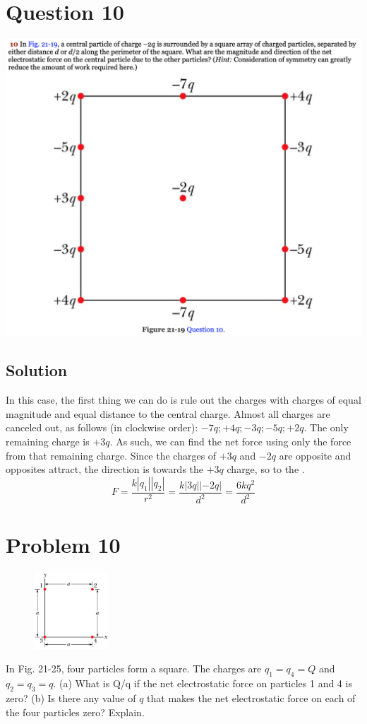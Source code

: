 \documentclass[12pt]{article}
\begin{document}
\section*{Question 10}
\includegraphics[width=\textwidth]{picture_3.png} 

\subsection*{Solution}
In this case, the first thing we can do is rule out the charges with charges of equal magnitude and equal distance to the central charge. Almost all charges are canceled out, as follows (in clockwise order): \(-7q; +4q; -3q; -5q; +2q\). The only remaining charge is $+3q$. As such, we can find the net force using only the force from that remaining charge. Since the charges of $+3q$ and $-2q$ are opposite and opposites attract, the direction is towards the $+3q$ charge, so to the .
\[F = \frac{k\left|q_1\right|\left|q_2\right|}{r^2} 
    = \frac{k\left|3q\right|\left|-2q\right|}{d^2} 
    = \boxed{\frac{6kq^2}{d^2}} \]

\pagebreak
\section*{Problem 10}
\begin{figure}
    \vspace{-50pt}
    \includegraphics[width=0.25\textwidth,height=0.25\textwidth]{picture_4.png} 
\end{figure}
In Fig. 21-25, four particles form a square. The charges are $q_1 = q_4 = Q$ and $q_2 = q_3 = q$. (a) What is Q/q if the net electrostatic force on particles 1 and 4 is zero? (b) Is there any value of $q$ that makes the net electrostatic force on each of the four particles zero? Explain.
\end{document}
